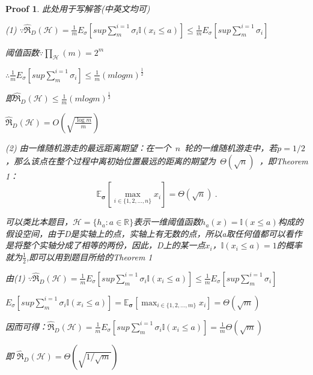 \documentclass[a4paper,UTF8]{article}
\numberwithin{equation}{section}
\newtheorem*{myProof}{Proof}
\begin{document}
\begin{myProof}
    此处用于写解答(中英文均可)
    
    
    (1)
    $\because \hat{\mathfrak{R}}_{D}(\mathcal{H}) = \frac{1}{m}E_\sigma \left [ sup\sum_{m}^{i=1} \sigma _i\mathbb{I}(x_i\leq a)\right ]\leq \frac{1}{m}E_\sigma \left [ sup\sum_{m}^{i=1} \sigma _i\right ]$
    
    阈值函数$\because \prod_{\mathcal{H}} \left ( m \right ) = 2^m $
    
    $\therefore \frac{1}{m}E_\sigma \left [ sup\sum_{m}^{i=1} \sigma _i\right ]\leq \frac{1}{m}\left ( mlogm \right )^\frac{1}{2}$
    
    即$\hat{\mathfrak{R}}_{D}(\mathcal{H})\leq \frac{1}{m}\left ( mlogm \right )^\frac{1}{2}$
    
    $\hat{\mathfrak{R}}_{D}(\mathcal{H})=O\left(\sqrt{\frac{\log m}{m}}\right)$
    
    (2)
    由一维随机游走的最远距离期望：在一个~$n$~轮的一维随机游走中，若$p=1/2$，那么该点在整个过程中离初始位置最远的距离的期望为~$\Theta\left(\sqrt{n}\right)$~，即Theorem 1：
    $$ \mathbb{E}_{\boldsymbol{\sigma}}\left[ \max_{i\in\{1,2,\dots,n\}}x_i \right]= \Theta\left(\sqrt{n}\right)~.$$
    
    可以类比本题目，$ \mathcal{H}=\{h_a:a\in\mathbb{R}\} $表示一维阈值函数$ h_a(x)=\mathbb{I}(x\leq a) $构成的假设空间，由于D是实轴上的点，实轴上有无数的点，所以a取任何值都可以看作是将整个实轴分成了相等的两份，因此，D上的某一点$x_i$，$\mathbb{I}(x_i\leq a)=1$的概率就为$\frac{1}{2}$,即可以用到题目所给的Theorem 1
    
    由(1) $\because \hat{\mathfrak{R}}_{D}(\mathcal{H}) = \frac{1}{m}E_\sigma \left [ sup\sum_{m}^{i=1} \sigma _i\mathbb{I}(x_i\leq a)\right ]\leq \frac{1}{m}E_\sigma \left [ sup\sum_{m}^{i=1} \sigma _i\right ]$
    
    $E_\sigma \left [ sup\sum_{m}^{i=1} \sigma _i\mathbb{I}(x_i\leq a)\right ] = \mathbb{E}_{\boldsymbol{\sigma}}\left[ \max_{i\in\{1,2,\dots,m\}}x_i \right] = \Theta\left(\sqrt{m}\right)$
    
    因而可得：$\hat{\mathfrak{R}}_{D}(\mathcal{H}) = \frac{1}{m}E_\sigma \left [ sup\sum_{m}^{i=1} \sigma _i\mathbb{I}(x_i\leq a)\right ] = \frac{1}{m} \Theta\left(\sqrt{m}\right)$
    
    即 $\hat{\mathfrak{R}}_{D}(\mathcal{H}) = \Theta\left(\sqrt{1/\sqrt{m}}\right)$
    
    
    
\end{myProof}~\\
\end{document}
